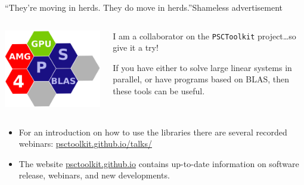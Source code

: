 \documentclass[xcolor={svgnames,usenames}]{beamer}
\begin{document}
\begin{frame}{``They're moving in herds. They do move in herds.''}{Shameless advertisement}

\begin{columns}
\begin{column}{0.3\textwidth}
\centering
\includegraphics[width=0.8\columnwidth]{psctoolkit.png}
\end{column}
\begin{column}{0.7\textwidth}
I am a collaborator on the \texttt{PSCToolkit} project\ldots so give it a try! 

\vfill
If you have either to solve large linear systems in parallel,
or have programs based on BLAS, then these tools can be useful.
\end{column}
\end{columns}

\begin{itemize}
	\item For an introduction on  how to use the libraries there are several recorded webinars: \href{https://psctoolkit.github.io/talks/}{psctoolkit.github.io/talks/}
	\item The website \href{https://psctoolkit.github.io/}{psctoolkit.github.io} contains up-to-date information on software release, webinars, and new developments.
\end{itemize}

\end{frame}
\end{document}
